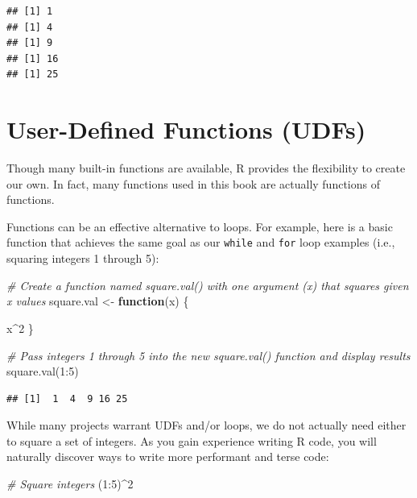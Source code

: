 \documentclass[
]{book}
\newenvironment{Shaded}{\begin{snugshade}}{\end{snugshade}}
\newcommand{\CommentTok}[1]{\textcolor[rgb]{0.56,0.35,0.01}{\textit{#1}}}
\newcommand{\ControlFlowTok}[1]{\textcolor[rgb]{0.13,0.29,0.53}{\textbf{#1}}}
\newcommand{\DecValTok}[1]{\textcolor[rgb]{0.00,0.00,0.81}{#1}}
\newcommand{\FunctionTok}[1]{\textcolor[rgb]{0.00,0.00,0.00}{#1}}
\newcommand{\NormalTok}[1]{#1}
\newcommand{\OtherTok}[1]{\textcolor[rgb]{0.56,0.35,0.01}{#1}}
\newcommand{\SpecialCharTok}[1]{\textcolor[rgb]{0.00,0.00,0.00}{#1}}
\begin{document}
\begin{verbatim}
## [1] 1
## [1] 4
## [1] 9
## [1] 16
## [1] 25
\end{verbatim}

\hypertarget{user-defined-functions-udfs}{%
\section{User-Defined Functions (UDFs)}\label{user-defined-functions-udfs}}

Though many built-in functions are available, R provides the flexibility to create our own. In fact, many functions used in this book are actually functions of functions.

Functions can be an effective alternative to loops. For example, here is a basic function that achieves the same goal as our \texttt{while} and \texttt{for} loop examples (i.e., squaring integers 1 through 5):

\begin{Shaded}
\begin{Highlighting}[]
\CommentTok{\# Create a function named square.val() with one argument (x) that squares given x values}
\NormalTok{square.val }\OtherTok{\textless{}{-}} \ControlFlowTok{function}\NormalTok{(x) \{}
  
\NormalTok{  x}\SpecialCharTok{\^{}}\DecValTok{2}
\NormalTok{\}}

\CommentTok{\# Pass integers 1 through 5 into the new square.val() function and display results}
\FunctionTok{square.val}\NormalTok{(}\DecValTok{1}\SpecialCharTok{:}\DecValTok{5}\NormalTok{)}
\end{Highlighting}
\end{Shaded}

\begin{verbatim}
## [1]  1  4  9 16 25
\end{verbatim}

While many projects warrant UDFs and/or loops, we do not actually need either to square a set of integers. As you gain experience writing R code, you will naturally discover ways to write more performant and terse code:

\begin{Shaded}
\begin{Highlighting}[]
\CommentTok{\# Square integers}
\NormalTok{(}\DecValTok{1}\SpecialCharTok{:}\DecValTok{5}\NormalTok{)}\SpecialCharTok{\^{}}\DecValTok{2}
\end{Highlighting}
\end{Shaded}
\end{document}
